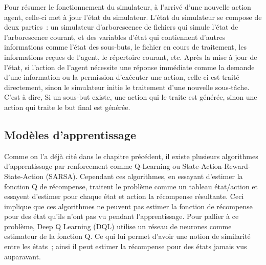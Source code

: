 Pour résumer le fonctionnement du simulateur, à l’arrivé d’une nouvelle action agent, celle-ci met à jour l’état du simulateur. L’état du simulateur se compose de deux parties : un simulateur d’arborescence de fichiers qui simule l’état de l’arborescence courant, et des variables d’état qui contiennent d’autres informations comme l’état des sous-buts, le fichier en cours de traitement, les informations reçues de l’agent, le répertoire courant, etc. Après la mise à jour de l’état, si l’action de l’agent nécessite une réponse immédiate comme la demande d’une information ou la permission d’exécuter une action, celle-ci est traité directement, sinon le simulateur initie le traitement d’une nouvelle sous-tâche. C’est à dire, Si un sous-but existe, une action qui le traite est générée, sinon une action qui traite le but final est générée.
	\subsection{Modèles d'apprentissage}
	Comme on l’a déjà cité dans le chapitre précédent, il existe plusieurs algorithmes d’apprentissage par renforcement comme Q-Learning ou State-Action-Reward-State-Action (SARSA)\cite{Rummery1994}. Cependant ces algorithmes, en essayant d’estimer la fonction Q de récompense, traitent le problème comme un tableau état/action et essayent d’estimer pour chaque état et action la récompense résultante. Ceci implique que ces algorithmes ne peuvent pas estimer la fonction de récompense pour des état qu’ils n’ont pas vu pendant l’apprentissage. Pour pallier à ce problème, Deep Q Learning (DQL)\cite{Mnih2015} utilise un réseau de neurones comme estimateur de la fonction Q. Ce qui lui permet d’avoir une notion de similarité entre les états ; ainsi il peut estimer la récompense pour des états jamais vus auparavant.
